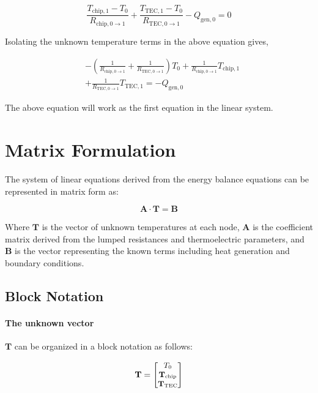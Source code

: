 \documentclass[10pt,a4paper,twocolumn]{article}
\begin{document}
\begin{equation*}
	\frac{T_{\text{chip},1} - T_{0}}{R_{\text{chip},0\to 1}} + \frac{T_{\text{TEC},1} - T_{0}}{R_{\text{TEC},0\to 1}} - Q_{\text{gen},0} = 0
\end{equation*}

Isolating the unknown temperature terms in the above equation gives,

\begin{equation}
	\begin{aligned}
		 & -\left( \frac{1}{R_{\text{chip},0\to 1}} + \frac{1}{R_{\text{TEC},0\to 1}} \right) T_{0} + \frac{1}{R_{\text{chip},0\to 1}} T_{\text{chip},1} \\ &+ \frac{1}{R_{\text{TEC},0\to 1}} T_{\text{TEC},1} = - Q_{\text{gen},0}
	\end{aligned}
\end{equation}

The above equation will work as the first equation in the linear system.

\section{Matrix Formulation}

The system of linear equations derived from the energy balance equations can be represented in matrix form as:

\begin{equation}
	\mathbf{A} \cdot \mathbf{T} = \mathbf{B}
\end{equation}

Where $\mathbf{T}$ is the vector of unknown temperatures at each node, $\mathbf{A}$ is the coefficient matrix derived from the lumped resistances and thermoelectric parameters, and $\mathbf{B}$ is the vector representing the known terms including heat generation and boundary conditions.

\subsection{Block Notation}

\paragraph{The unknown vector} $\mathbf{T}$ can be organized in a block notation as follows:

\begin{equation}
	\small
	\mathbf{T} = \begin{bmatrix}
		T_{0}                    \\
		\mathbf{T_{\text{chip}}} \\
		\mathbf{T_{\text{TEC}}}
	\end{bmatrix}
\end{equation}
\end{document}
